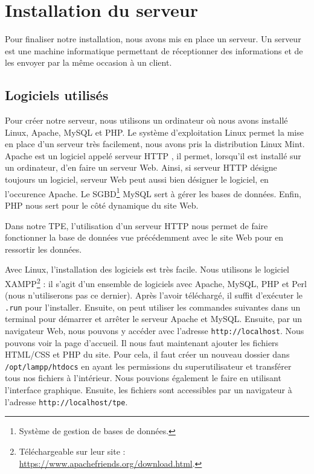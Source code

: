 \chapter{Installation du serveur}
\label{chapitre:serveur}

Pour finaliser notre installation, nous avons mis en place un serveur. Un serveur est une machine informatique permettant de réceptionner des informations et de les envoyer par la même occasion à un client.

\section{Logiciels utilisés}
\label{section:logiciels}

Pour créer notre serveur, nous utilisons un ordinateur où nous avons installé Linux, Apache, MySQL et PHP. Le système d'exploitation Linux permet la mise en place d'un serveur très facilement, nous avons pris la distribution Linux Mint. Apache est un logiciel appelé \og serveur HTTP \fg, il permet, lorsqu'il est installé sur un ordinateur, d'en faire un serveur Web. Ainsi, si \og serveur HTTP \fg{} désigne toujours un logiciel, \og serveur Web \fg{} peut aussi bien désigner le logiciel, en l'occurence Apache. Le SGBD\footnote{Système de gestion de bases de données.} MySQL sert à gérer les bases de données. Enfin, PHP nous sert pour le côté dynamique du site Web.

Dans notre TPE, l'utilisation d'un serveur HTTP nous permet de faire fonctionner la base de données vue précédemment avec le site Web pour en ressortir les données.

\Espace

Avec Linux, l'installation des logiciels est très facile. Nous utilisons le logiciel XAMPP\footnote{Téléchargeable sur leur site : \url{https://www.apachefriends.org/download.html}.} : il s'agit d'un ensemble de logiciels avec Apache, MySQL, PHP et Perl (nous n'utiliserons pas ce dernier). Après l'avoir téléchargé, il suffit d'exécuter le \verb-.run- pour l'installer. Ensuite, on peut utiliser les commandes suivantes dans un terminal pour démarrer et arrêter le serveur Apache et MySQL.
Ensuite, par un navigateur Web, nous pouvons y accéder avec l'adresse \verb-http://localhost-. Nous pouvons voir la page d'accueil. Il nous faut maintenant ajouter les fichiers HTML/CSS et PHP du site. Pour cela, il faut créer un nouveau dossier dans \verb-/opt/lampp/htdocs- en ayant les permissions du superutilisateur et transférer tous nos fichiers à l'intérieur.
Nous pouvions également le faire en utilisant l'interface graphique. Ensuite, les fichiers sont accessibles par un navigateur à l'adresse \verb-http://localhost/tpe-.

